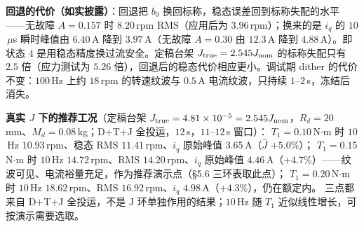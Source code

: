 \documentclass[11pt,a4paper]{article}
\theoremstyle{remark}\newtheorem{remark}{注}
\begin{document}
\textbf{回退的代价（如实披露）}：回退把 $b_0$ 换回标称，稳态误差回到标称失配的水平——无故障 $A=0.157$ 时 $8.20$\,rpm RMS（应用后为 $3.96$\,rpm）；换来的是 $i_q$ 的 $10$\,$\mu$s 瞬时峰值由 $6.40$\,A 降到 $3.97$\,A（无故障 $A=0.30$ 由 $12.3$\,A 降到 $4.88$\,A）。即状态 $4$ 是用稳态精度换过流安全。定稿台架 $J_{\rm true}=2.545J_{\rm nom}$ 的标称失配只有 $2.5$ 倍（应力测试为 $5.26$ 倍），回退后的稳态代价相应更小。调试期 dither 的代价不变：$100$\,Hz 上约 $18$\,rpm 的转速纹波与 $0.5$\,A 电流纹波，只持续 $1$--$2$\,s，冻结后消失。

\textbf{真实 $J$ 下的推荐工况}（定稿台架 $J_{\rm true}=4.81\times10^{-5}=2.545J_{\rm nom}$，$R_d=20$\,mm、$M_d=0.08$\,kg；D$+$T$+$J 全投运，$12$\,s，$11$--$12$\,s 窗口）：
$T_1=0.10$\,N$\cdot$m 时 $10$\,Hz $10.93$\,rpm、稳态 RMS $11.41$\,rpm、$i_q$ 原始峰值 $3.65$\,A（$\hat J$ $+5.0\%$）；
$T_1=0.15$\,N$\cdot$m 时 $10$\,Hz $\mathbf{14.72}$\,rpm、RMS $14.20$\,rpm、$i_q$ 原始峰值 $4.46$\,A（$+4.7\%$）——纹波可见、电流裕量充足，作为推荐演示点（§5.6 三环表取此点）；
$T_1=0.20$\,N$\cdot$m 时 $10$\,Hz $18.62$\,rpm、RMS $16.92$\,rpm、$i_q$ $4.98$\,A（$+4.3\%$），仍在额定内。
三点都来自 D$+$T$+$J 全投运，不是 J 环单独作用的结果；$10$\,Hz 随 $T_1$ 近似线性增长，可按演示需要选取。
\end{document}
